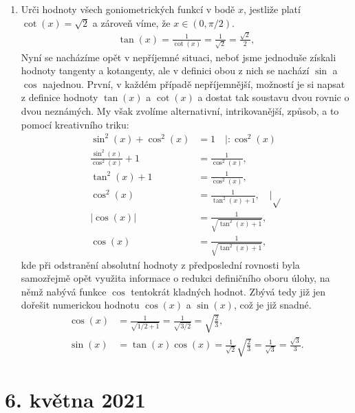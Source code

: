 \documentclass[11pt,a4paper]{article}
\begin{document}
\begin{enumerate}
            \item Urči hodnoty všech goniometrických funkcí v bodě $x$, jestliže platí $\cot(x) = \sqrt 2$ a zároveň víme, že $x \in (0,\pi/2)$.
            \begin{align*}
                \tan(x) = \frac{1}{\cot(x)} = \frac{1}{\sqrt 2} = \frac{\sqrt 2}{2},
            \end{align*}
            Nyní se nacházíme opět v nepříjemné situaci, neboť jsme jednoduše získali hodnoty tangenty a kotangenty, ale v definici obou z nich se nachází $\sin$ a $\cos$ najednou. První, v každém případě nepříjemnější, možností je si napsat z definice hodnoty $\tan(x)$ a $\cot(x)$ a dostat tak soustavu dvou rovnic o dvou neznámých. My však zvolíme alternativní, intrikovanější, způsob, a to pomocí kreativního triku: 
            \begin{align*}
                \sin^2(x) + \cos^2(x) &= 1 \quad \Big| : \cos^2(x)
            \\
                \frac{\sin^2(x)}{\cos^2(x)} + 1 &= \frac{1}{\cos^2(x)},
            \\
                \tan^2(x) + 1 &= \frac{1}{\cos^2(x)},
            \\
                \cos^2(x) &= \frac{1}{\tan^2(x) + 1}, \quad \Big| \sqrt{}
            \\
                |\cos(x)| &= \frac{1}{\sqrt{\tan^2(x) + 1}},
            \\
                \cos(x) &= \frac{1}{\sqrt{\tan^2(x) + 1}},
            \end{align*}
            kde při odstranění absolutní hodnoty z předposlední rovnosti byla samozřejmě opět využita informace o redukci definičního oboru úlohy, na němž nabývá funkce $\cos$ tentokrát kladných hodnot. Zbývá tedy již jen dořešit numerickou hodnotu $\cos(x)$ a $\sin(x)$, což je již snadné.
            \begin{align*}
                \cos(x) &= \frac{1}{\sqrt{1/2 + 1}} = \frac{1}{\sqrt{3/2}} = \sqrt{\frac{2}{3}},
            \\
                \sin(x) &= \tan(x) \cos(x) = \frac{1}{\sqrt 2} \sqrt{\frac 23} = \frac{1}{\sqrt 3} = \frac{\sqrt 3}{3}.
            \end{align*}

        \end{enumerate}

    \section*{6. května 2021}
        
\end{document}
